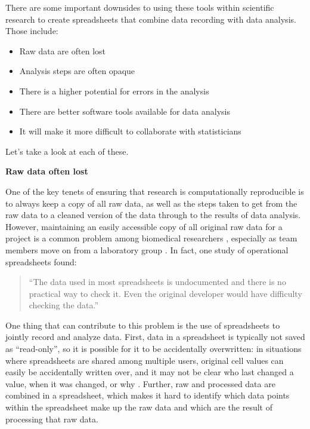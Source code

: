 \documentclass[]{tufte-book}
\providecommand{\tightlist}{%
  \setlength{\itemsep}{0pt}\setlength{\parskip}{0pt}}
\begin{document}
There are some important downsides to using these tools within scientific
research to create spreadsheets that combine data recording with data analysis.
Those include:

\begin{itemize}
\tightlist
\item
  Raw data are often lost
\item
  Analysis steps are often opaque
\item
  There is a higher potential for errors in the analysis
\item
  There are better software tools available for data analysis
\item
  It will make it more difficult to collaborate with statisticians
\end{itemize}

Let's take a look at each of these.

\textbf{Raw data often lost}

One of the key tenets of ensuring that research is computationally reproducible
is to always keep a copy of all raw data, as well as the steps taken to get from
the raw data to a cleaned version of the data through to the results of data
analysis. However, maintaining an easily accessible copy of all original raw data
for a project is a common problem among biomedical researchers
\citep{goodman2014ten}, especially as team members move on from a laboratory group
\citep{myneni2010organization}. In fact, one study of
operational spreadsheets found:

\begin{quote}
``The data used in most spreadsheets is undocumented and there is no practical
way to check it. Even the original developer would have difficulty checking the
data.'' \citep{powell2009errors}
\end{quote}

One thing that can contribute to this problem is the use of spreadsheets to
jointly record and analyze data. First, data in a spreadsheet is typically not
saved as ``read-only'', so it is possible for it to be accidentally overwritten:
in situations where spreadsheets are shared among multiple users, original cell
values can easily be accidentally written over, and it may not be clear who last
changed a value, when it was changed, or why \citep{altarawneh2017pilot}. Further,
raw and processed data are combined in a spreadsheet, which makes it hard to
identify which data points within the spreadsheet make up the raw data and which
are the result of processing that raw data.
\end{document}
